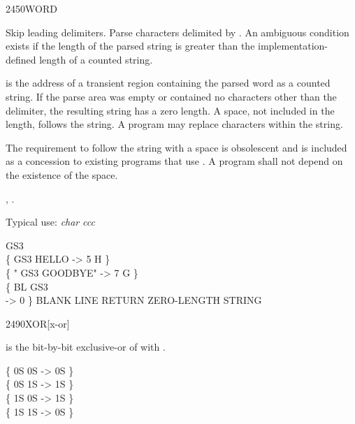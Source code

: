\begin{worddef}{2450}{WORD}
\item {}

	Skip leading delimiters. Parse characters  delimited
	by .  An ambiguous condition exists if the length of
	the parsed string is greater than the implementation-defined
	length of a counted string.

	 is the address of a transient region containing
	the parsed word as a counted string. If the parse area was
	empty or contained no characters other than the delimiter, the
	resulting string has a zero length. A space, not included in the
	length, follows the string. A program may replace characters
	within the string.

\note
	The requirement to follow the string with a space is obsolescent
	and is included as a concession to existing programs that use
	. A program shall not depend on the existence of
	the space.

\see {},
	.

	\begin{defer}
	\rationale %
		Typical use: \emph{char}  \emph{ccc}

	\testing
		\word{:} GS3     \word{;} \\
		\{  GS3 HELLO -> 5  H \} \\
		\{  " GS3 GOODBYE" -> 7  G \} \\
		\{ BL GS3 \\
		 -> 0 \} \tab[4]  BLANK LINE RETURN ZERO-LENGTH STRING
	\end{defer}
\end{worddef}


\begin{worddef}{2490}{XOR}[x-or]
\item {}

	 is the bit-by-bit exclusive-or of  with
	\param{x_2}.

	\begin{defer}
	\testing
		\{ 0S 0S  -> 0S \} \\
		\{ 0S 1S  -> 1S \} \\
		\{ 1S 0S  -> 1S \} \\
		\{ 1S 1S  -> 0S \}
	\end{defer}
\end{worddef}


